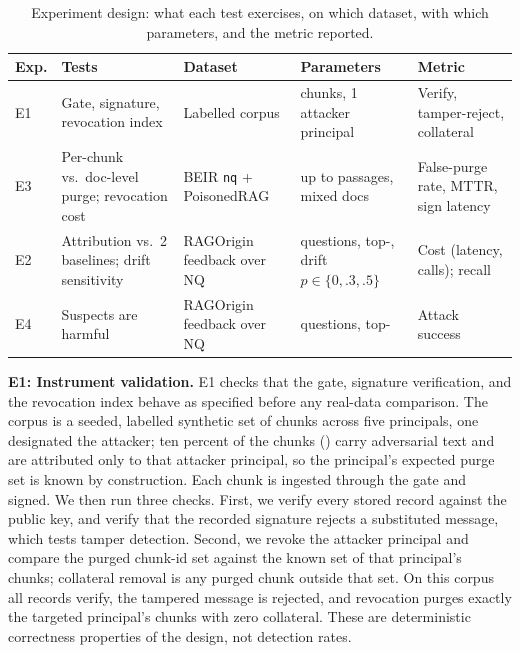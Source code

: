\documentclass[12pt]{article}
\begin{document}
\begin{table}[htbp]
\centering
\caption{Experiment design: what each test exercises, on which dataset, with
which parameters, and the metric reported.}
\label{tab:exps}
\footnotesize
\setlength{\tabcolsep}{5pt}
\renewcommand{\arraystretch}{0.9}
\begin{tabularx}{\textwidth}{@{}l>{\hsize}L>{\hsize}L>{\hsize}L>{\hsize}L@{}}
\toprule
Exp. & Tests & Dataset & Parameters & Metric \\
\midrule
E1 & Gate, signature, revocation index & Labelled corpus & \EZeroChunks{} chunks, 1 attacker principal & Verify, tamper-reject, collateral \\
E3 & Per-chunk vs.\ doc-level purge; revocation cost & BEIR \texttt{nq} + PoisonedRAG & up to \FullPassages{} passages, \EThreeDocs{} mixed docs & False-purge rate, MTTR, sign latency \\
E2 & Attribution vs.\ 2 baselines; drift sensitivity & RAGOrigin feedback over NQ & \Nquestions{} questions, top-\TopK{}, drift $p\in\{0,.3,.5\}$ & Cost (latency, calls); recall \\
E4 & Suspects are harmful & RAGOrigin feedback over NQ & \Nquestions{} questions, top-\AsrTopK{} & Attack success \\
\bottomrule
\end{tabularx}
\end{table}

\textbf{E1: Instrument validation.} E1 checks that the gate, signature
verification, and the revocation index behave as specified before any real-data
comparison. The corpus is a seeded, labelled synthetic set of \EZeroChunks{}
chunks across five principals, one designated the attacker; ten percent of the
chunks (\EZeroPurged{}) carry adversarial text and are attributed only to that
attacker principal, so the principal's expected purge set is known by
construction. Each chunk is ingested through the gate and signed. We then run
three checks. First, we verify every stored record against the public key, and
verify that the recorded signature rejects a substituted message, which tests
tamper detection. Second, we revoke the attacker principal and compare the
purged chunk-id set against the known set of that principal's chunks; collateral
removal is any purged chunk outside that set. On this corpus all records verify,
the tampered message is rejected, and revocation purges exactly the targeted
principal's \EZeroPurged{} chunks with zero collateral. These are deterministic
correctness properties of the design, not detection rates.
\end{document}
